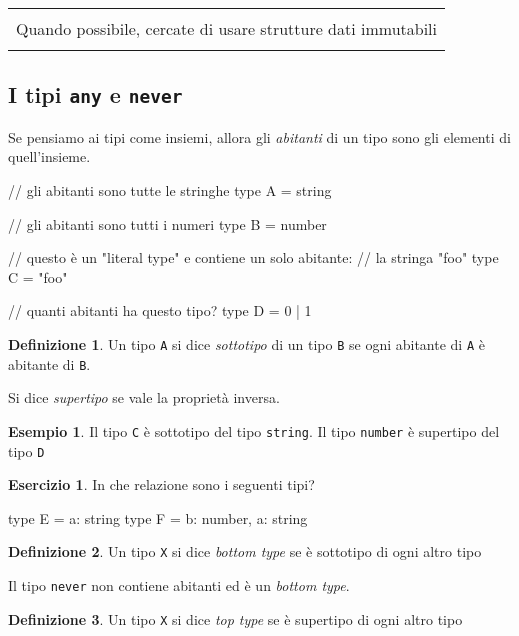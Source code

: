 \documentclass[12pt]{article}
\theoremstyle{definition}
\newtheorem{definition}{Definizione}[section]
\newtheorem{example}{Esempio}[subsection]
\newtheorem{exercise}{Esercizio}[subsection]
\newenvironment{boxed}
    {\begin{center}
    \begin{tabular}{|p{0.9\textwidth}|}
    \hline\\
    }
    {
    \\\\\hline
    \end{tabular}
    \end{center}
    }
\newenvironment{code}
  {\vspace{0.5cm} \VerbatimEnvironment\begin{typescriptcode}}
  {\end{typescriptcode} \vspace{0.2cm}}
\begin{document}
\begin{boxed}
Quando possibile, cercate di usare strutture dati immutabili
\end{boxed}

\subsection{I tipi \texttt{any} e \texttt{never}}

Se pensiamo ai tipi come insiemi, allora gli \emph{abitanti} di un tipo sono gli elementi di quell'insieme.

\begin{code}
// gli abitanti sono tutte le stringhe
type A = string

// gli abitanti sono tutti i numeri
type B = number

// questo è un "literal type" e contiene un solo abitante:
// la stringa "foo"
type C = "foo"

// quanti abitanti ha questo tipo?
type D = 0 | 1
\end{code}

\begin{definition}
Un tipo \texttt{A} si dice \emph{sottotipo} di un tipo \texttt{B} se ogni abitante di \texttt{A} è abitante di \texttt{B}.

Si dice \emph{supertipo} se vale la proprietà inversa.
\end{definition}

\begin{example}
Il tipo \texttt{C} è sottotipo del tipo \texttt{string}.
Il tipo \texttt{number} è supertipo del tipo \texttt{D}
\end{example}

\begin{exercise}
In che relazione sono i seguenti tipi?

\begin{code}
type E = { a: string }
type F = { b: number, a: string }
\end{code}
\end{exercise}

\begin{definition}
Un tipo \texttt{X} si dice \emph{bottom type} se è sottotipo di ogni altro tipo
\end{definition}

Il tipo \texttt{never} non contiene abitanti ed è un \emph{bottom type}.

\begin{definition}
Un tipo \texttt{X} si dice \emph{top type} se è supertipo di ogni altro tipo
\end{definition}
\end{document}
